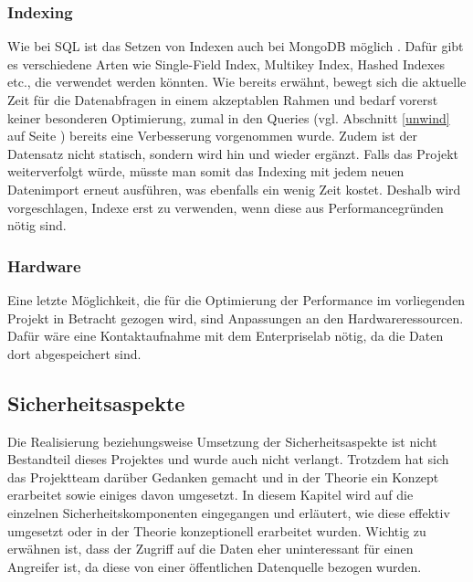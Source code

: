 \documentclass[12pt,titlepage]{article}
\begin{document}
\subsubsection{Indexing}
Wie bei SQL ist das Setzen von Indexen auch bei MongoDB möglich . Dafür gibt es verschiedene Arten wie \glqq Single-Field Index\grqq, \glqq Multikey Index\grqq, \glqq Hashed Indexes\grqq\, etc., die verwendet werden könnten. Wie bereits erwähnt, bewegt sich die aktuelle Zeit für die Datenabfragen in einem akzeptablen Rahmen und bedarf vorerst keiner besonderen Optimierung, zumal in den Queries (vgl. Abschnitt \ref{unwind} auf Seite \pageref{unwind}) bereits eine Verbesserung vorgenommen wurde. Zudem ist der Datensatz nicht statisch, sondern wird hin und wieder ergänzt. Falls das Projekt weiterverfolgt würde, müsste man somit das Indexing mit jedem neuen Datenimport erneut ausführen, was ebenfalls ein wenig Zeit kostet. Deshalb wird vorgeschlagen, Indexe erst zu verwenden, wenn diese aus Performancegründen nötig sind. 

\subsubsection{Hardware}
Eine letzte Möglichkeit, die für die Optimierung der Performance im vorliegenden Projekt in Betracht gezogen wird, sind Anpassungen an den Hardwareressourcen. Dafür wäre eine Kontaktaufnahme mit dem Enterpriselab nötig, da die Daten dort abgespeichert sind. 

\subsection{Sicherheitsaspekte}
Die Realisierung beziehungsweise Umsetzung der Sicherheitsaspekte ist nicht Bestandteil dieses Projektes und wurde auch nicht verlangt. Trotzdem hat sich das Projektteam darüber Gedanken gemacht und in der Theorie ein Konzept erarbeitet sowie einiges davon umgesetzt. In diesem Kapitel wird auf die einzelnen Sicherheitskomponenten eingegangen und erläutert, wie diese effektiv umgesetzt oder in der Theorie konzeptionell erarbeitet wurden. Wichtig zu erwähnen ist, dass der Zugriff auf die Daten eher uninteressant für einen Angreifer ist, da diese von einer öffentlichen Datenquelle bezogen wurden.
\end{document}
